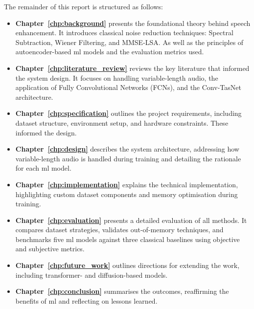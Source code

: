 The remainder of this report is structured as follows:
\begin{itemize}
    \item \textbf{Chapter~\ref{chp:background}} presents the foundational theory behind speech enhancement. It introduces classical noise reduction techniques: Spectral Subtraction, Wiener Filtering, and MMSE-LSA. As well as the principles of autoencoder-based \gls{ml} models and the evaluation metrics used.

    \item \textbf{Chapter~\ref{chp:literature_review}} reviews the key literature that informed the system design. It focuses on handling variable-length audio, the application of Fully Convolutional Networks (FCNs), and the Conv-TasNet architecture.

    \item \textbf{Chapter~\ref{chp:specification}} outlines the project requirements, including dataset structure, environment setup, and hardware constraints. These informed the design.

    \item \textbf{Chapter~\ref{chp:design}} describes the system architecture, addressing how variable-length audio is handled during training and detailing the rationale for each \gls{ml} model.

    \item \textbf{Chapter~\ref{chp:implementation}} explains the technical implementation, highlighting custom dataset components and memory optimisation during training.

    \item \textbf{Chapter~\ref{chp:evaluation}} presents a detailed evaluation of all methods. It compares dataset strategies, validates out-of-memory techniques, and benchmarks five \gls{ml} models against three classical baselines using objective and subjective metrics.

    \item \textbf{Chapter~\ref{chp:future_work}} outlines directions for extending the work, including transformer- and diffusion-based models.

    \item \textbf{Chapter~\ref{chp:conclusion}} summarises the outcomes, reaffirming the benefits of \gls{ml} and reflecting on lessons learned.
\end{itemize}
